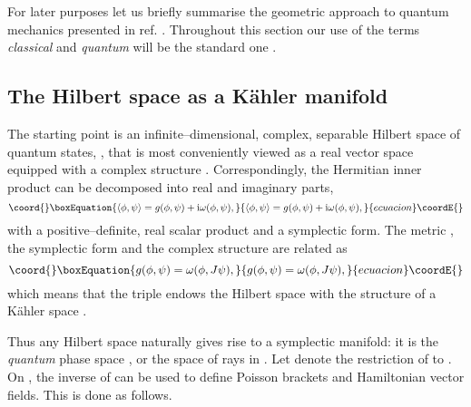 \documentclass[a4paper,a4paper]{article}
\begin{document}
For later purposes let us briefly summarise the geometric approach to quantum mechanics 
presented in ref. \cite{ASHTEKAR}. Throughout this section our use of the terms {\it classical} 
and {\it quantum} will be the standard one \cite{GALINDO}.

\subsection{The Hilbert space as a K\"ahler manifold}\label{hika}

The starting point is an infinite--dimensional, complex, separable Hilbert space of quantum states, 
\coordHE{}, that is most conveniently viewed as a real vector space equipped with a complex 
structure \coordHE{}. Correspondingly, the Hermitian inner product can be decomposed into real and 
imaginary parts,
\begin{equation}\coord{}\boxEquation{
\langle\phi,\psi\rangle = g(\phi,\psi) + {\rm i}\omega(\phi,\psi),
\label{dec}
}{
\langle\phi,\psi\rangle = g(\phi,\psi) + {\rm i}\omega(\phi,\psi),
}{ecuacion}\coordE{}\end{equation}
with \coordHE{} a positive--definite, real scalar product and \myHighlight{$\omega$}\coordHE{} a symplectic form.
The metric \coordHE{}, the symplectic form \myHighlight{$\omega$}\coordHE{} and the complex structure \coordHE{} are related as
\begin{equation}\coord{}\boxEquation{
g(\phi,\psi)=\omega(\phi,J\psi),
\label{kah}
}{
g(\phi,\psi)=\omega(\phi,J\psi),
}{ecuacion}\coordE{}\end{equation}
which means that the triple \coordHE{} endows the Hilbert space 
\coordHE{} with the structure of a K\"ahler space \cite{ARNOLD}. 

Thus any Hilbert space naturally gives rise to a symplectic manifold:
it is the {\it quantum} phase space \coordHE{}, or the space of rays in \coordHE{}. 
Let \coordHE{} denote the restriction of \myHighlight{$\omega$}\coordHE{} to \coordHE{}.
On \coordHE{}, the inverse of \coordHE{} can be used to define Poisson brackets 
and Hamiltonian vector fields. This is done as follows.
\end{document}

